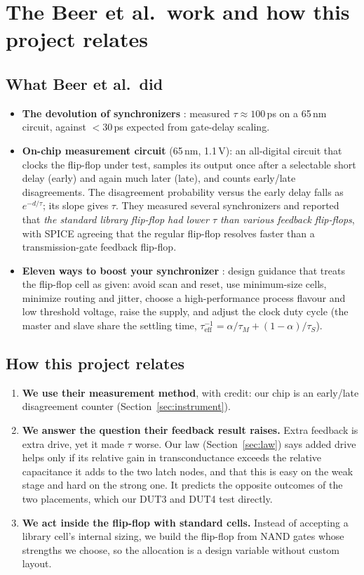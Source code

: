 \documentclass[11pt]{article}
\begin{document}
\section{The Beer et al.\ work and how this project relates}
\label{sec:beer}
\subsection{What Beer et al.\ did}
\begin{itemize}
\item \textbf{The devolution of synchronizers} \cite{beer2010}: measured $\tau\approx100$\,ps on a 65\,nm circuit,
  against $<30$\,ps expected from gate-delay scaling.
\item \textbf{On-chip measurement circuit} \cite{beer2011} (65\,nm, 1.1\,V): an all-digital circuit that clocks the
  flip-flop under test, samples its output once after a selectable short delay (early) and again much later
  (late), and counts early/late disagreements. The disagreement probability versus the early delay falls as
  $e^{-d/\tau}$; its slope gives $\tau$. They measured several synchronizers and reported that \emph{the standard
  library flip-flop had lower $\tau$ than various feedback flip-flops}, with SPICE agreeing that the regular
  flip-flop resolves faster than a transmission-gate feedback flip-flop.
\item \textbf{Eleven ways to boost your synchronizer} \cite{beer2015}: design guidance that treats the flip-flop
  cell as given: avoid scan and reset, use minimum-size cells, minimize routing and jitter, choose a
  high-performance process flavour and low threshold voltage, raise the supply, and adjust the clock duty cycle
  (the master and slave share the settling time, $\tau_{\mathrm{eff}}^{-1} = \alpha/\tau_M + (1-\alpha)/\tau_S$).
\end{itemize}

\subsection{How this project relates}
\begin{enumerate}
\item \textbf{We use their measurement method}, with credit: our chip is an early/late disagreement counter
  (Section~\ref{sec:instrument}).
\item \textbf{We answer the question their feedback result raises.} Extra feedback is extra drive, yet it made
  $\tau$ worse. Our law (Section~\ref{sec:law}) says added drive helps only if its relative gain in
  transconductance exceeds the relative capacitance it adds to the two latch nodes, and that this is easy on the
  weak stage and hard on the strong one. It predicts the opposite outcomes of the two placements, which our DUT3
  and DUT4 test directly.
\item \textbf{We act inside the flip-flop with standard cells.} Instead of accepting a library cell's internal
  sizing, we build the flip-flop from NAND gates whose strengths we choose, so the allocation is a design
  variable without custom layout.
\end{enumerate}
\end{document}
